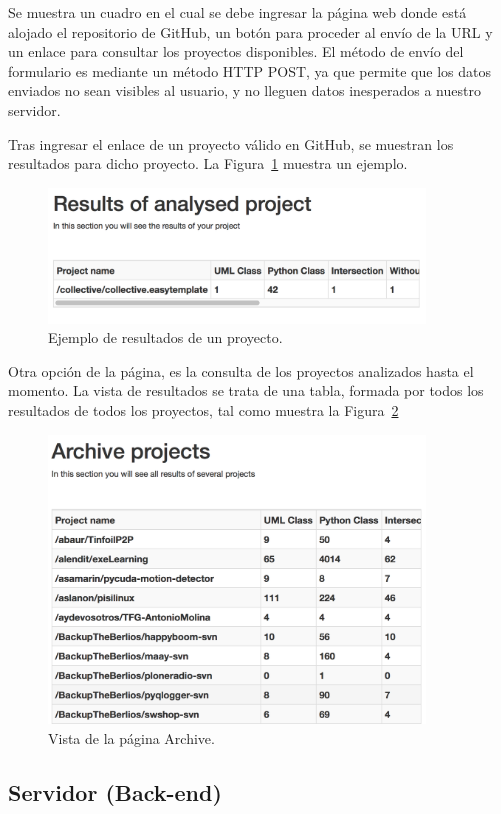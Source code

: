 \documentclass[a4paper, 12pt]{book}
\begin{document}
Se muestra un cuadro en el cual se debe ingresar la página web donde está alojado el repositorio de GitHub,
un botón para proceder al envío de la URL y un enlace para consultar los proyectos disponibles.
El método de envío del formulario es mediante un método HTTP POST, ya que permite que los datos enviados no sean visibles al usuario,
y no lleguen datos inesperados a nuestro servidor.

Tras ingresar el enlace de un proyecto válido en GitHub, se muestran los resultados para dicho proyecto. La Figura~\ref{fig:resultsproject} muestra un ejemplo.
\begin{figure}[htb]
  \centering
  \includegraphics[width=10cm, keepaspectratio]{img/resultsproject}
  \caption{Ejemplo de resultados de un proyecto.}
  \label{fig:resultsproject}
\end{figure}

Otra opción de la página, es la consulta de los proyectos analizados hasta el momento. La vista de resultados se trata de una tabla, formada por todos los resultados de todos los proyectos, tal como muestra la Figura~\ref{fig:archive}
\begin{figure}[htb]
  \centering
  \includegraphics[width=10cm, keepaspectratio]{img/archive}
  \caption{Vista de la página Archive.}
  \label{fig:archive}
\end{figure}

\subsection{Servidor (Back-end)}
\label{subsec:servidor}
\end{document}
